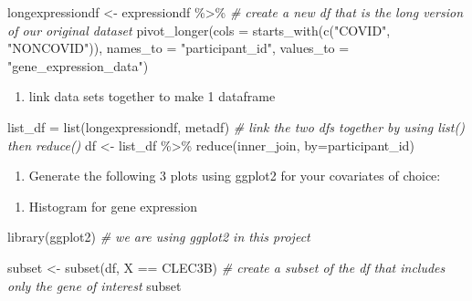 \documentclass[
]{article}
\newenvironment{Shaded}{\begin{snugshade}}{\end{snugshade}}
\newcommand{\AttributeTok}[1]{\textcolor[rgb]{0.77,0.63,0.00}{#1}}
\newcommand{\CommentTok}[1]{\textcolor[rgb]{0.56,0.35,0.01}{\textit{#1}}}
\newcommand{\FunctionTok}[1]{\textcolor[rgb]{0.00,0.00,0.00}{#1}}
\newcommand{\NormalTok}[1]{#1}
\newcommand{\OtherTok}[1]{\textcolor[rgb]{0.56,0.35,0.01}{#1}}
\newcommand{\SpecialCharTok}[1]{\textcolor[rgb]{0.00,0.00,0.00}{#1}}
\newcommand{\StringTok}[1]{\textcolor[rgb]{0.31,0.60,0.02}{#1}}
\providecommand{\tightlist}{%
  \setlength{\itemsep}{0pt}\setlength{\parskip}{0pt}}
\begin{document}
\begin{Shaded}
\begin{Highlighting}[]
\NormalTok{longexpressiondf }\OtherTok{\textless{}{-}}\NormalTok{ expressiondf }\SpecialCharTok{\%\textgreater{}\%} \CommentTok{\# create a new df that is the long version of our original dataset}
  \FunctionTok{pivot\_longer}\NormalTok{(}\AttributeTok{cols =} \FunctionTok{starts\_with}\NormalTok{(}\FunctionTok{c}\NormalTok{(}\StringTok{"COVID"}\NormalTok{, }\StringTok{"NONCOVID"}\NormalTok{)),}
               \AttributeTok{names\_to =} \StringTok{"participant\_id"}\NormalTok{,}
               \AttributeTok{values\_to =} \StringTok{"gene\_expression\_data"}\NormalTok{)}
\end{Highlighting}
\end{Shaded}

\begin{enumerate}
\def\labelenumi{\arabic{enumi}.}
\setcounter{enumi}{1}
\tightlist
\item
  link data sets together to make 1 dataframe
\end{enumerate}

\begin{Shaded}
\begin{Highlighting}[]
\NormalTok{list\_df }\OtherTok{=} \FunctionTok{list}\NormalTok{(longexpressiondf, metadf) }\CommentTok{\# link the two dfs together by using list() then reduce()}
\NormalTok{df }\OtherTok{\textless{}{-}}\NormalTok{ list\_df }\SpecialCharTok{\%\textgreater{}\%} \FunctionTok{reduce}\NormalTok{(inner\_join, }\AttributeTok{by=}\StringTok{\textquotesingle{}participant\_id\textquotesingle{}}\NormalTok{)}
\end{Highlighting}
\end{Shaded}

\begin{enumerate}
\def\labelenumi{\arabic{enumi}.}
\setcounter{enumi}{2}
\tightlist
\item
  Generate the following 3 plots using ggplot2 for your covariates of
  choice:
\end{enumerate}

\begin{enumerate}
\def\labelenumi{(\alph{enumi})}
\tightlist
\item
  Histogram for gene expression
\end{enumerate}

\begin{Shaded}
\begin{Highlighting}[]
\FunctionTok{library}\NormalTok{(ggplot2) }\CommentTok{\# we are using ggplot2 in this project}

\NormalTok{subset }\OtherTok{\textless{}{-}} \FunctionTok{subset}\NormalTok{(df, X }\SpecialCharTok{==} \StringTok{\textquotesingle{}CLEC3B\textquotesingle{}}\NormalTok{) }\CommentTok{\# create a subset of the df that includes only the gene of interest}
\NormalTok{subset}
\end{Highlighting}
\end{Shaded}
\end{document}
